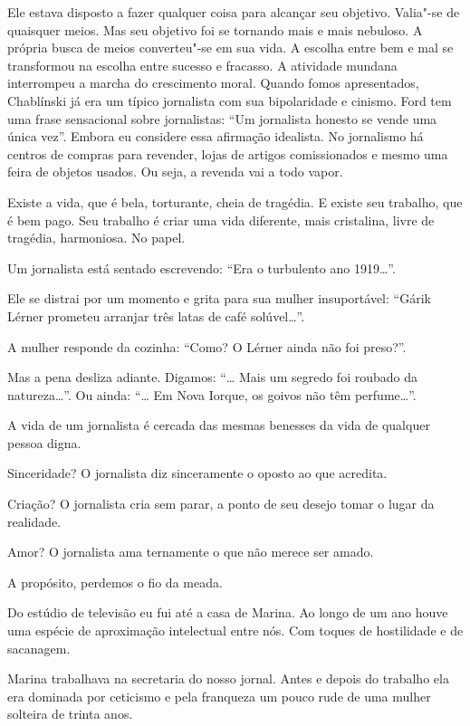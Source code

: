 Ele estava disposto a fazer qualquer coisa para alcançar seu objetivo.
Valia"-se de quaisquer meios. Mas seu objetivo foi se tornando mais e
mais nebuloso. A própria busca de meios converteu"-se em sua vida. A
escolha entre bem e mal se transformou na escolha entre sucesso e
fracasso. A atividade mundana interrompeu a marcha do crescimento moral.
Quando fomos apresentados, Chablínski já era um típico jornalista com
sua bipolaridade e cinismo. Ford tem uma frase sensacional sobre
jornalistas: ``Um jornalista honesto se vende uma única vez''. Embora eu
considere essa afirmação idealista. No jornalismo há centros de compras
para revender, lojas de artigos comissionados e mesmo uma feira de
objetos usados. Ou seja, a revenda vai a todo vapor.

Existe a vida, que é bela, torturante, cheia de tragédia. E existe seu
trabalho, que é bem pago. Seu trabalho é criar uma vida diferente, mais
cristalina, livre de tragédia, harmoniosa. No papel.

Um jornalista está sentado escrevendo: ``Era o turbulento ano 1919\ldots{}''.

Ele se distrai por um momento e grita para sua mulher insuportável:
``Gárik Lérner prometeu arranjar três latas de café solúvel\ldots{}''.

A mulher responde da cozinha: ``Como? O Lérner ainda não foi preso?''.

Mas a pena desliza adiante. Digamos: ``\ldots{} Mais um segredo foi roubado
da natureza\ldots{}''. Ou ainda: ``\ldots{} Em Nova Iorque, os goivos não têm
perfume\ldots{}''.

A vida de um jornalista é cercada das mesmas benesses da vida de
qualquer pessoa digna.

Sinceridade? O jornalista diz sinceramente o oposto ao que acredita.

Criação? O jornalista cria sem parar, a ponto de seu desejo tomar o
lugar da realidade.

Amor? O jornalista ama ternamente o que não merece ser amado.

A propósito, perdemos o fio da meada.

Do estúdio de televisão eu fui até a casa de Marina. Ao longo de um ano
houve uma espécie de aproximação intelectual entre nós. Com toques de
hostilidade e de sacanagem.

Marina trabalhava na secretaria do nosso jornal. Antes e depois do
trabalho ela era dominada por ceticismo e pela franqueza um pouco rude
de uma mulher solteira de trinta anos.

